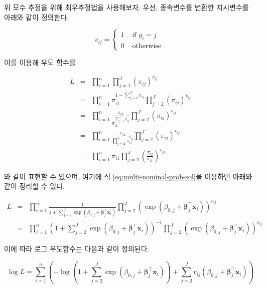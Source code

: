 \documentclass[
]{book}
\begin{document}
위 모수 추정을 위해 최우추정법을 사용해보자. 우선, 종속변수를 변환한 지시변수를 아래와 같이 정의한다.

\begin{equation*}
v_{ij} = \begin{cases}
1 & \text{ if } y_i = j\\
0 & \text{ otherwise }
\end{cases}
\end{equation*}

이를 이용해 우도 함수를

\begin{eqnarray*}
L &=& \prod_{i = 1}^{n} \prod_{j = 1}^{J} \left( \pi_{ij} \right)^{v_{ij}} \\
&=& \prod_{i = 1}^{n} \pi_{i1}^{1 - \sum_{j = 2}^{J} v_{ij}} \prod_{j = 2}^{J} \left( \pi_{ij} \right)^{v_{ij}}\\
&=& \prod_{i = 1}^{n} \frac{\pi_{i1}}{\pi_{i1}^{\sum_{j = 2}^{J} v_{ij}}} \prod_{j = 2}^{J} \left( \pi_{ij} \right)^{v_{ij}}\\
&=& \prod_{i = 1}^{n} \frac{\pi_{i1}}{\prod_{j = 2}^{J} \pi_{i1}^{v_{ij}}} \prod_{j = 2}^{J} \left( \pi_{ij} \right)^{v_{ij}}\\
&=& \prod_{i = 1}^{n} \pi_{i1} \prod_{j = 2}^{J} \left( \frac{\pi_{ij}}{\pi_{i1}} \right)^{v_{ij}}
\end{eqnarray*}

와 같이 표현할 수 있으며, 여기에 식 \eqref{eq:multi-nominal-prob-sol}을 이용하면 아래와 같이 정리할 수 있다.

\begin{eqnarray*}
L &=& \prod_{i = 1}^{n} \frac{1}{1 + \sum_{j = 2}^{J} \exp \left( \beta_{0,j} + \boldsymbol\beta_{j}^\top \mathbf{x}_i \right)} \prod_{j = 2}^{J} \left( \exp \left( \beta_{0,j} + \boldsymbol\beta_{j}^\top \mathbf{x}_i \right) \right)^{v_{ij}}\\
&=& \prod_{i = 1}^{n} \left( 1 + \sum_{j = 2}^{J} \exp \left( \beta_{0,j} + \boldsymbol\beta_{j}^\top \mathbf{x}_i \right) \right)^{-1} \prod_{j = 2}^{J} \left( \exp \left( \beta_{0,j} + \boldsymbol\beta_{j}^\top \mathbf{x}_i \right) \right)^{v_{ij}}
\end{eqnarray*}

이에 따라 로그 우도함수는 다음과 같이 정의된다.

\begin{equation}
\log L = \sum_{i = 1}^{n} \left( - \log \left( 1 + \sum_{j = 2}^{J} \exp \left( \beta_{0,j} + \boldsymbol\beta_{j}^\top \mathbf{x}_i \right) \right) + \sum_{j = 2}^{J} v_{ij} \left( \beta_{0,j} + \boldsymbol\beta_{j}^\top \mathbf{x}_i \right) \right) 
\label{eq:multi-nominal-logit-loglik}
\end{equation}
\end{document}
